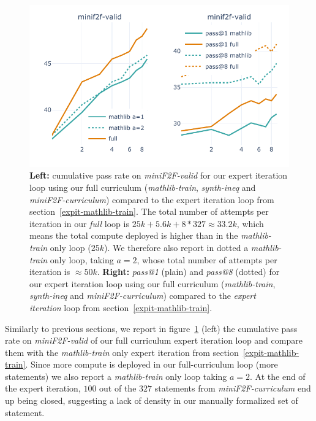\documentclass[nohyperref]{article}
\theoremstyle{plain}
\theoremstyle{definition}
\theoremstyle{remark}
\begin{document}
\begin{figure}[ht]
    \begin{center}
    \centerline{\includegraphics[width=\columnwidth]{figures/pp-curr-1.pdf}}
    \caption{{\bf Left:} cumulative pass rate on \textit{miniF2F-valid} for our expert iteration loop using our full curriculum (\textit{mathlib-train}, \textit{synth-ineq} and \textit{miniF2F-curriculum}) compared to the expert iteration loop from section~\ref{expit-mathlib-train}. The total number of attempts per iteration in our \textit{full} loop is $25k + 5.6k + 8*327 \approx 33.2k$, which means the total compute deployed is higher than in the \textit{mathlib-train} only loop ($25k$). We therefore also report in dotted a \textit{mathlib-train} only loop, taking $a=2$, whose total number of attempts per iteration is $\approx 50k$. {\bf Right:} \textit{pass@1} (plain) and \textit{pass@8} (dotted) for our expert iteration loop using our full curriculum (\textit{mathlib-train}, \textit{synth-ineq} and \textit{miniF2F-curriculum}) compared to the \textit{expert iteration} loop from section~\ref{expit-mathlib-train}.}
    \label{fig:pp-curr-1}
    \end{center}
\end{figure}

Similarly to previous sections, we report in figure~\ref{fig:pp-curr-1} (left) the cumulative pass rate on \textit{miniF2F-valid} of our full curriculum expert iteration loop and compare them with the \textit{mathlib-train} only expert iteration from section~\ref{expit-mathlib-train}. Since more compute is deployed in our full-curriculum loop (more statements) we also report a \textit{mathlib-train} only loop taking $a=2$. At the end of the expert iteration, $100$ out of the $327$ statements from \textit{miniF2F-curriculum} end up being closed, suggesting a lack of density in our manually formalized set of statement. 
\end{document}
